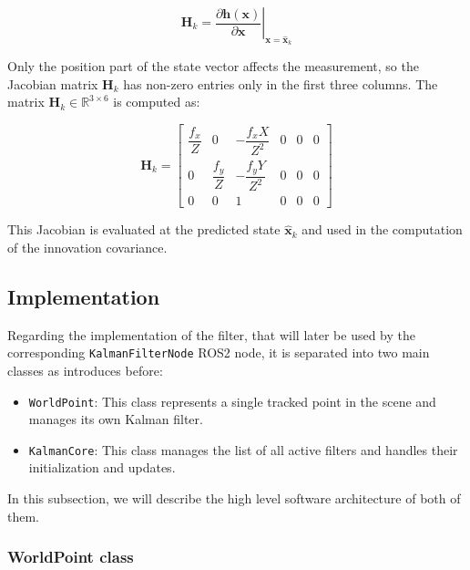 \begin{equation}
  \mathbf{H}_k = \left. \frac{\partial \mathbf{h}(\mathbf{x})}{\partial \mathbf{x}} \right|_{\mathbf{x} = \hat{\mathbf{x}}_k}
\end{equation}

Only the position part of the state vector affects the measurement, so the Jacobian matrix $\mathbf{H}_k$ has 
non-zero entries only in the first three columns. The matrix $\mathbf{H}_k \in \mathbb{R}^{3 \times 6}$ is computed as:

\begin{equation}
  \mathbf{H}_k =
  \begin{bmatrix}
    \dfrac{f_x}{Z} & 0 & -\dfrac{f_x X}{Z^2} & 0 & 0 & 0 \\
    0 & \dfrac{f_y}{Z} & -\dfrac{f_y Y}{Z^2} & 0 & 0 & 0 \\
    0 & 0 & 1 & 0 & 0 & 0
  \end{bmatrix}
\end{equation}

This Jacobian is evaluated at the predicted state $\hat{\mathbf{x}}_{k}$ and used in the computation of the innovation 
covariance.

\subsection{Implementation}\label{sec:ImplementationKalmanFilter}

Regarding the implementation of the filter, that will later be used by the corresponding
\texttt{KalmanFilterNode} ROS2 node, it is separated into two main classes as introduces before:

\begin{itemize}
  \item \texttt{WorldPoint}: This class represents a single tracked point in the scene and manages its own Kalman filter.
  \item \texttt{KalmanCore}: This class manages the list of all active filters and handles their initialization and updates.
\end{itemize}

In this subsection, we will describe the high level software architecture of both of them.

\subsubsection{WorldPoint class}\label{sec:WorldPointClassKalmanFilter}

